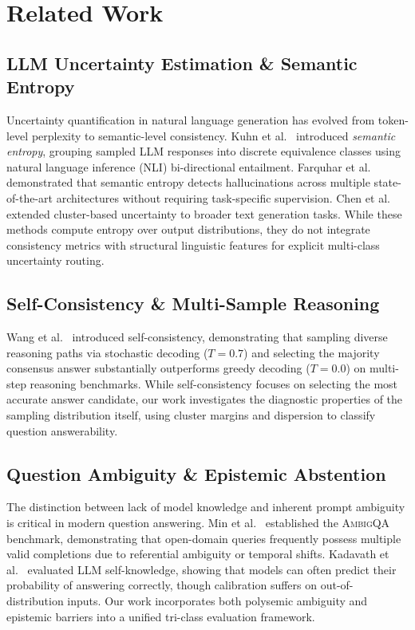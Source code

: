 \documentclass[conference]{IEEEtran}
\begin{document}
\section{Related Work}

\subsection{LLM Uncertainty Estimation \& Semantic Entropy}
Uncertainty quantification in natural language generation has evolved from token-level perplexity to semantic-level consistency. Kuhn et al.~\cite{kuhn2023semantic} introduced \textit{semantic entropy}, grouping sampled LLM responses into discrete equivalence classes using natural language inference (NLI) bi-directional entailment. Farquhar et al.~\cite{farquhar2024detecting} demonstrated that semantic entropy detects hallucinations across multiple state-of-the-art architectures without requiring task-specific supervision. Chen et al.~\cite{chen2023quantifying} extended cluster-based uncertainty to broader text generation tasks. While these methods compute entropy over output distributions, they do not integrate consistency metrics with structural linguistic features for explicit multi-class uncertainty routing.

\subsection{Self-Consistency \& Multi-Sample Reasoning}
Wang et al.~\cite{wang2023self} introduced self-consistency, demonstrating that sampling diverse reasoning paths via stochastic decoding ($T=0.7$) and selecting the majority consensus answer substantially outperforms greedy decoding ($T=0.0$) on multi-step reasoning benchmarks. While self-consistency focuses on selecting the most accurate answer candidate, our work investigates the diagnostic properties of the sampling distribution itself, using cluster margins and dispersion to classify question answerability.

\subsection{Question Ambiguity \& Epistemic Abstention}
The distinction between lack of model knowledge and inherent prompt ambiguity is critical in modern question answering. Min et al.~\cite{min2020ambigqa} established the \textsc{AmbigQA} benchmark, demonstrating that open-domain queries frequently possess multiple valid completions due to referential ambiguity or temporal shifts. Kadavath et al.~\cite{kadavath2022language} evaluated LLM self-knowledge, showing that models can often predict their probability of answering correctly, though calibration suffers on out-of-distribution inputs. Our work incorporates both polysemic ambiguity and epistemic barriers into a unified tri-class evaluation framework.
\end{document}
